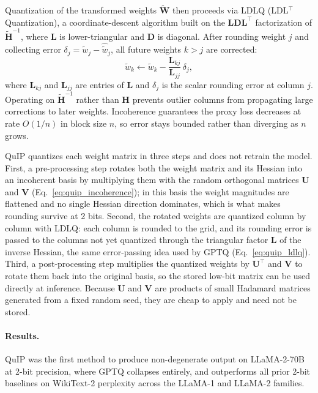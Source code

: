 Quantization of the transformed weights $\tilde{\bm{W}}$ then proceeds via LDLQ (LDL$^\top$ Quantization), a coordinate-descent algorithm built on the $\bm{L}\bm{D}\bm{L}^\top$ factorization of $\tilde{\bm{H}}^{-1}$, where $\bm{L}$ is lower-triangular and $\bm{D}$ is diagonal. After rounding weight $j$ and collecting error $\delta_j = \tilde{w}_j - \hat{\tilde{w}}_j$, all future weights $k > j$ are corrected:
\begin{equation}
  \tilde{w}_k \leftarrow \tilde{w}_k - \frac{\bm{L}_{kj}}{\bm{L}_{jj}}\,\delta_j,
  \label{eq:quip_ldlq}
\end{equation}
where $\bm{L}_{kj}$ and $\bm{L}_{jj}$ are entries of $\bm{L}$ and $\delta_j$ is the scalar rounding error at column $j$. Operating on $\tilde{\bm{H}}^{-1}$ rather than $\bm{H}$ prevents outlier columns from propagating large corrections to later weights. Incoherence guarantees the proxy loss decreases at rate $O(1/n)$ in block size $n$, so error stays bounded rather than diverging as $n$ grows.

QuIP quantizes each weight matrix in three steps and does not retrain the model. First, a pre-processing step rotates both the weight matrix and its Hessian into an incoherent basis by multiplying them with the random orthogonal matrices $\bm{U}$ and $\bm{V}$ (Eq.~\ref{eq:quip_incoherence}); in this basis the weight magnitudes are flattened and no single Hessian direction dominates, which is what makes rounding survive at 2 bits. Second, the rotated weights are quantized column by column with LDLQ: each column is rounded to the grid, and its rounding error is passed to the columns not yet quantized through the triangular factor $\bm{L}$ of the inverse Hessian, the same error-passing idea used by GPTQ (Eq.~\ref{eq:quip_ldlq}). Third, a post-processing step multiplies the quantized weights by $\bm{U}^\top$ and $\bm{V}$ to rotate them back into the original basis, so the stored low-bit matrix can be used directly at inference. Because $\bm{U}$ and $\bm{V}$ are products of small Hadamard matrices generated from a fixed random seed, they are cheap to apply and need not be stored.

\paragraph{Results.}
QuIP was the first method to produce non-degenerate output on LLaMA-2-70B at 2-bit precision, where GPTQ collapses entirely, and outperforms all prior 2-bit baselines on WikiText-2 perplexity across the LLaMA-1 and LLaMA-2 families.

